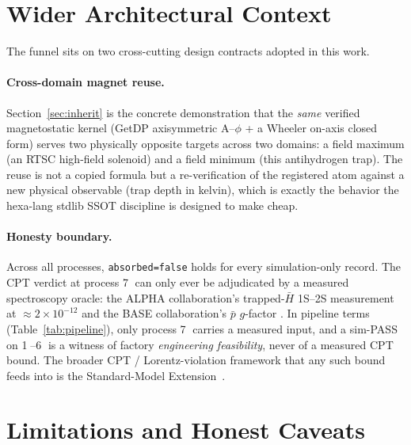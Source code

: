 \documentclass[11pt,a4paper]{article}
\begin{document}
\section{Wider Architectural Context}
\label{sec:context}

The funnel sits on two cross-cutting design contracts adopted in this work.

\paragraph{Cross-domain magnet reuse.} Section~\ref{sec:inherit} is the
concrete demonstration that the \emph{same} verified magnetostatic kernel
(GetDP axisymmetric A--$\phi$ + a Wheeler on-axis closed form) serves two
physically opposite targets across two domains: a field maximum (an RTSC
high-field solenoid) and a field minimum (this antihydrogen trap). The reuse
is not a copied formula but a re-verification of the registered atom against
a new physical observable (trap depth in kelvin), which is exactly the
behavior the hexa-lang stdlib SSOT discipline is designed to make cheap.

\paragraph{Honesty boundary.} Across all processes,
\texttt{absorbed=false} holds for every simulation-only record. The CPT
verdict at process \textcircled{\scriptsize 7} can only ever be adjudicated
by a measured spectroscopy oracle: the ALPHA collaboration's trapped-$\bar H$
1S--2S measurement at $\approx\!2\!\times\!10^{-12}$
\citep{ahmadi2018alpha1s2s} and the BASE collaboration's $\bar p$ $g$-factor
\citep{smorra2017base}. In pipeline terms (Table~\ref{tab:pipeline}), only
process \textcircled{\scriptsize 7} carries a measured input, and a sim-PASS
on \textcircled{\scriptsize 1}--\textcircled{\scriptsize 6} is a witness of
factory \emph{engineering feasibility}, never of a measured CPT bound. The
broader CPT / Lorentz-violation framework that any such bound feeds into is
the Standard-Model Extension~\citep{kostelecky2011lorentz}.

\section{Limitations and Honest Caveats}
\label{sec:limits}
\end{document}
